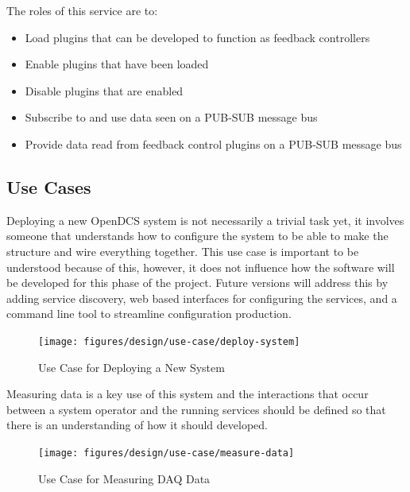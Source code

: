       The roles of this service are to:

      \begin{itemize}
        \item Load plugins that can be developed to function as feedback
          controllers
        \item Enable plugins that have been loaded
        \item Disable plugins that are enabled
        \item Subscribe to and use data seen on a PUB-SUB message bus
        \item Provide data read from feedback control plugins on a PUB-SUB
          message bus
      \end{itemize}

  \subsection{Use Cases}\label{sec:dsg-use}


    Deploying a new OpenDCS system is not necessarily a trivial task yet, it
    involves someone that understands how to configure the system to be able
    to make the structure and wire everything together. This use case is
    important to be understood because of this, however, it does not influence
    how the software will be developed for this phase of the project. Future
    versions will address this by adding service discovery, web based interfaces
    for configuring the services, and a command line tool to streamline
    configuration production.

    \begin{figure}[H]
      \texttt{[image: figures/design/use-case/deploy-system]}
      \caption{Use Case for Deploying a New System}
      \label{fig:dsg-use-deploy}
    \end{figure}

    Measuring data is a key use of this system and the interactions that occur
    between a system operator and the running services should be defined so that
    there is an understanding of how it should developed.

    \begin{figure}[H]
      \texttt{[image: figures/design/use-case/measure-data]}
      \caption{Use Case for Measuring DAQ Data}
      \label{fig:dsg-use-measure}
    \end{figure}


